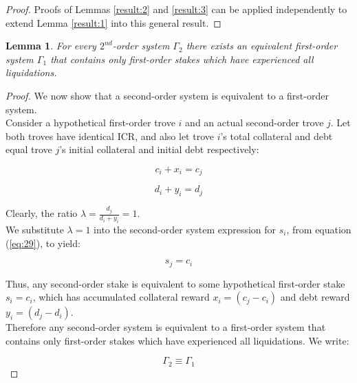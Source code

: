 \documentclass[reqno]{article}
\newtheorem{lemma}[theorem]{Lemma}
\begin{document}
\begin{proof}
  Proofs of Lemmas \ref{result:2} and \ref{result:3} can be applied independently to extend Lemma \ref{result:1} into this general result.
\end{proof}

\begin{lemma} \label{result:5}
  For every $2^{nd}$-order system $\Gamma_2$ there exists an equivalent first-order system $\Gamma_1$ that contains only first-order stakes which have experienced all liquidations.
\end{lemma}

\begin{proof}
We now show that a second-order system is equivalent to a first-order system.\\

Consider a hypothetical first-order trove $i$ and an actual second-order trove $j$. Let both troves have identical ICR, and also let trove $i$’s total collateral and debt equal trove $j$’s initial collateral and initial debt respectively:

\begin{equation} 
    c_i+x_i=c_j
\end{equation}

\begin{equation} 
    d_i+y_i=d_j
\end{equation}

\bigskip
Clearly, the ratio  $\lambda = \frac{d_j}{d_i+y_i} = 1$.\\

We substitute $\lambda=1$ into the second-order system expression for $s_i$, from equation (\ref{eq:29}), to yield:

\begin{equation} 
    s_j=c_i
\end{equation}

\bigskip
Thus, any second-order stake is equivalent to some hypothetical first-order stake $s_i=c_i$, which has accumulated collateral reward $x_i=(c_j-c_i)$ and debt reward $y_i=(d_j-d_i)$.\\

Therefore any second-order system is equivalent to a first-order system that contains only first-order stakes which have experienced all liquidations. We write:

\begin{equation} 
    \Gamma_2 \equiv \Gamma_1
\end{equation}
\end{proof}
\end{document}
